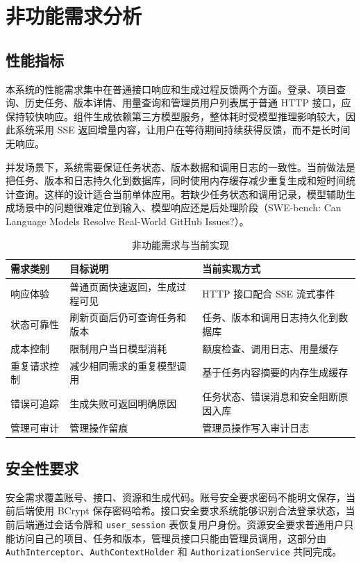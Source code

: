 \vspace{-0.25em}

\section{非功能需求分析}
\subsection{性能指标}
本系统的性能需求集中在普通接口响应和生成过程反馈两个方面。登录、项目查询、历史任务、版本详情、用量查询和管理员用户列表属于普通 HTTP 接口，应保持较快响应。组件生成依赖第三方模型服务，整体耗时受模型推理影响较大，因此系统采用 SSE 返回增量内容，让用户在等待期间持续获得反馈，而不是长时间无响应。

并发场景下，系统需要保证任务状态、版本数据和调用日志的一致性。当前做法是把任务、版本和日志持久化到数据库，同时使用内存缓存减少重复生成和短时间统计查询。这样的设计适合当前单体应用。若缺少任务状态和调用记录，模型辅助生成场景中的问题很难定位到输入、模型响应还是后处理阶段（SWE-bench: Can Language Models Resolve Real-World GitHub Issues?）\cite{jimenez2024swebench}。

\begin{table}[htbp]
\centering
\caption{非功能需求与当前实现}
\label{tab:chapter3-nonfunctional}
\small
\begin{tabular}{@{}p{}p{}p{}@{}}
\toprule
需求类别 & 目标说明 & 当前实现方式 \\
\midrule
响应体验 & 普通页面快速返回，生成过程可见 & HTTP 接口配合 SSE 流式事件 \\
状态可靠性 & 刷新页面后仍可查询任务和版本 & 任务、版本和调用日志持久化到数据库 \\
成本控制 & 限制用户当日模型消耗 & 额度检查、调用日志、用量缓存 \\
重复请求控制 & 减少相同需求的重复模型调用 & 基于任务内容摘要的内存生成缓存 \\
错误可追踪 & 生成失败可返回明确原因 & 任务状态、错误消息和安全阻断原因入库 \\
管理可审计 & 管理操作留痕 & 管理员操作写入审计日志 \\
\bottomrule
\end{tabular}
\end{table}

\subsection{安全性要求}
安全需求覆盖账号、接口、资源和生成代码。账号安全要求密码不能明文保存，当前后端使用 BCrypt 保存密码哈希。接口安全要求系统能够识别合法登录状态，当前后端通过会话令牌和 \texttt{user\_session} 表恢复用户身份。资源安全要求普通用户只能访问自己的项目、任务和版本，管理员接口只能由管理员调用，这部分由 \texttt{AuthInterceptor}、\texttt{AuthContextHolder} 和 \texttt{AuthorizationService} 共同完成。

